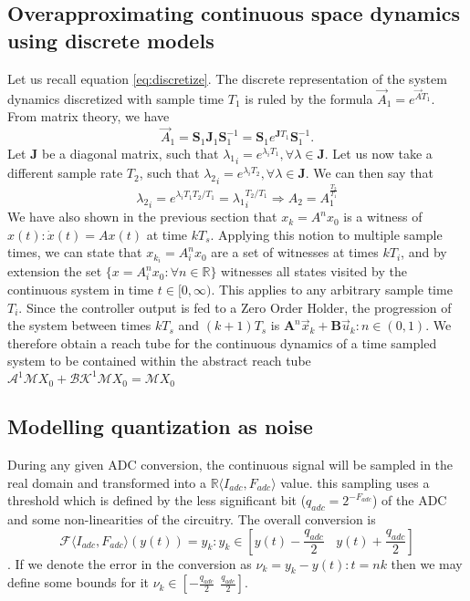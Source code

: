 \documentclass[runningheads,a4paper]{llncs}
\newcommand{\mat}[1]{\boldsymbol{#1}}
\begin{document}
\subsection{Overapproximating continuous space dynamics using discrete models}
Let us recall equation \ref{eq:discretize}. The discrete representation of the system dynamics discretized with sample time $T_1$ is ruled by the formula
$\vec{A}_1 = e^{\vec{A} T_1}$. From matrix theory, we have 
\begin{equation}
\vec{A}_1 = \mat{S}_1\mat{J}_1\mat{S}_1^{-1}= \mat{S}_1e^{\mat{J} T_1}\mat{S}_1^{-1}.
\end{equation}
Let $\mat{J}$ be a diagonal matrix, such that ${\lambda_1}_i=e^{\lambda_i T_1}, \forall \lambda \in \mat{J}$.
Let us now take a different sample rate $T_2$, such that ${\lambda_2}_i=e^{\lambda_i T_2}, \forall \lambda \in \mat{J}$. We can then say that 
\begin{equation}
{\lambda_2}_i=e^{\lambda_i T_1 T_2/T_1}={\lambda_1}_i^{T_2/T_1} \Rightarrow A_2=A_1^{\frac{T_2}{T_1}}
\end{equation}
We have also shown in the previous section that $x_k=A^nx_0$ is a witness of $x(t): \dot{x}(t)=Ax(t)$ at time $kT_s$. Applying this notion to multiple sample times, we can state that $x_{k_i}=A_i^nx_0$ are a set of witnesses at times $kT_i$, and by extension the set $\{x=A_i^nx_0 : \forall n \in \mathbb{R} \}$ witnesses all states visited by the continuous system in time $t \in [0,\infty)$. This applies to any arbitrary sample time $T_i$.
Since the controller output is fed to a Zero Order Holder, the progression of the system between times $kT_s$ and $(k+1)T_s$ is $\mat{A}^n\vec{x}_k+\mat{B}\vec{u}_k : n \in (0,1)$. We therefore obtain a reach tube for the continuous dynamics of a time sampled system to be contained within the abstract reach tube $\mathcal{A}^1\mathcal{M}X_0+\mathcal{BK}^1\mathcal{M}X_0=\mathcal{M}X_0$
\subsection{Modelling quantization as noise}

During any given ADC conversion, the continuous signal will be sampled in the real domain and transformed into a $\mathbb{R}\langle I_{adc},F_{adc} \rangle$ value. this sampling uses a threshold which is defined by the less significant bit ($q_{adc}=2^{-F_{adc}}$) of the ADC and some non-linearities of the circuitry. The overall conversion is
$$\mathcal{F}\langle I_{adc},F_{adc} \rangle(y(t)) = y_k : y_k \in \left[y(t)-\frac{q_{adc}}{2}\ \ \ \ y(t)+\frac{q_{adc}}{2}\right]$$.
If we denote the error in the conversion as $\nu_k=y_k-y(t) : t=nk$ then we may define some bounds for it $\nu_k \in [-\frac{q_{adc}}{2}\ \ \frac{q_{adc}}{2}]$.
\end{document}
